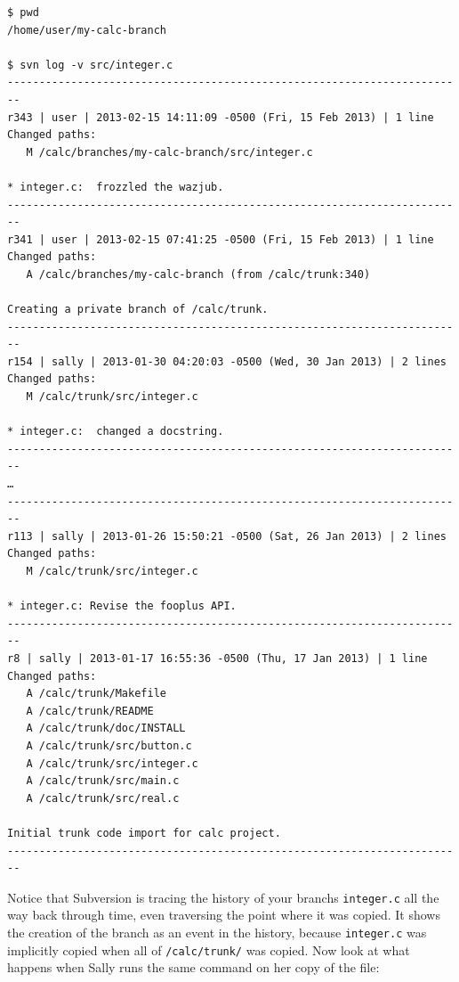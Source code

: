 \begin{verbatim}
$ pwd
/home/user/my-calc-branch

$ svn log -v src/integer.c
------------------------------------------------------------------------
r343 | user | 2013-02-15 14:11:09 -0500 (Fri, 15 Feb 2013) | 1 line
Changed paths:
   M /calc/branches/my-calc-branch/src/integer.c

* integer.c:  frozzled the wazjub.
------------------------------------------------------------------------
r341 | user | 2013-02-15 07:41:25 -0500 (Fri, 15 Feb 2013) | 1 line
Changed paths:
   A /calc/branches/my-calc-branch (from /calc/trunk:340)

Creating a private branch of /calc/trunk.
------------------------------------------------------------------------
r154 | sally | 2013-01-30 04:20:03 -0500 (Wed, 30 Jan 2013) | 2 lines
Changed paths:
   M /calc/trunk/src/integer.c

* integer.c:  changed a docstring.
------------------------------------------------------------------------
…
------------------------------------------------------------------------
r113 | sally | 2013-01-26 15:50:21 -0500 (Sat, 26 Jan 2013) | 2 lines
Changed paths:
   M /calc/trunk/src/integer.c

* integer.c: Revise the fooplus API.
------------------------------------------------------------------------
r8 | sally | 2013-01-17 16:55:36 -0500 (Thu, 17 Jan 2013) | 1 line
Changed paths:
   A /calc/trunk/Makefile
   A /calc/trunk/README
   A /calc/trunk/doc/INSTALL
   A /calc/trunk/src/button.c
   A /calc/trunk/src/integer.c
   A /calc/trunk/src/main.c
   A /calc/trunk/src/real.c

Initial trunk code import for calc project.
------------------------------------------------------------------------
\end{verbatim}

Notice that Subversion is tracing the history of your
branch\textquotesingle s \texttt{integer.c} all the way back through
time, even traversing the point where it was copied. It shows the
creation of the branch as an event in the history, because
\texttt{integer.c} was implicitly copied when all of
\texttt{/calc/trunk/} was copied. Now look at what happens when Sally
runs the same command on her copy of the file:

